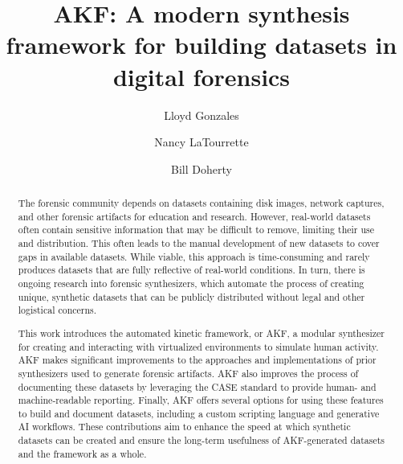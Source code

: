 \documentclass[final,5p,times,twocolumn]{elsarticle}
\begin{document}
\begin{frontmatter}

\title{AKF: A modern synthesis framework for building datasets in digital forensics}

\author[unr]{Lloyd Gonzales}
\author[unr]{Nancy LaTourrette}
\author[unr]{Bill Doherty}

\begin{abstract}
The forensic community depends on datasets containing disk images,
network captures, and other forensic artifacts for education and
research. However, real-world datasets often contain sensitive
information that may be difficult to remove, limiting their use and
distribution. This often leads to the manual development of new datasets
to cover gaps in available datasets. While viable, this approach is
time-consuming and rarely produces datasets that are fully reflective of
real-world conditions. In turn, there is ongoing research into forensic
synthesizers, which automate the process of creating unique, synthetic
datasets that can be publicly distributed without legal and other
logistical concerns.

This work introduces the automated kinetic framework, or AKF, a modular
synthesizer for creating and interacting with virtualized environments
to simulate human activity. AKF makes significant improvements to the
approaches and implementations of prior synthesizers used to generate
forensic artifacts. AKF also improves the process of documenting these
datasets by leveraging the CASE standard to provide human- and
machine-readable reporting. Finally, AKF offers several options for
using these features to build and document datasets, including a custom
scripting language and generative AI workflows. These contributions aim
to enhance the speed at which synthetic datasets can be created and
ensure the long-term usefulness of AKF-generated datasets and the
framework as a whole.
\end{abstract}



\end{frontmatter}
\end{document}
